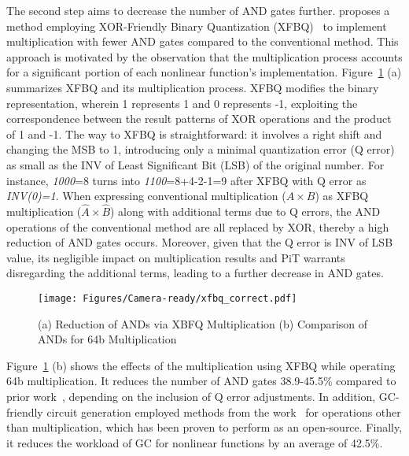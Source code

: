 The second step aims to decrease the number of AND gates further. \sysname proposes a method employing XOR-Friendly Binary Quantization (XFBQ)~\cite{jian2020fast} to implement multiplication with fewer AND gates compared to the conventional method. This approach is motivated by the observation that the multiplication process accounts for a significant portion of each nonlinear function's implementation. 
Figure~\ref{fig:circuit_generation} (a) summarizes XFBQ and its multiplication process. XFBQ modifies the binary representation, wherein 1 represents 1 and 0 represents -1, exploiting the correspondence between the result patterns of XOR operations and the product of 1 and -1. The way to XFBQ is straightforward: it involves a right shift and changing the MSB to 1, introducing only a minimal quantization error (Q error) as small as the INV of Least Significant Bit (LSB) of the original number. For instance, \textit{1000}=8 turns into \textit{1100}=8+4-2-1=9 after XFBQ with Q error as \textit{INV(0)=1}.  When expressing conventional multiplication ($A\times B$) as XFBQ multiplication ($\hat{A} \times \hat{B}$) along with additional terms due to Q errors, the AND operations of the conventional method are all replaced by XOR, thereby a high reduction of AND gates occurs. Moreover, given that the Q error is INV of LSB value, its negligible impact on multiplication results and PiT warrants disregarding the additional terms, leading to a further decrease in AND gates.

\begin{figure}[t]
    \vspace{-0.2in}
    \centering
    \texttt{[image: Figures/Camera-ready/xfbq\_correct.pdf]}
    \caption{(a) Reduction of ANDs via XBFQ Multiplication (b) Comparison of ANDs for 64b Multiplication}
    \vspace{-0.2in}
    \label{fig:circuit_generation}
\end{figure}

Figure~\ref{fig:circuit_generation} (b) shows the effects of the multiplication using XFBQ while operating 64b multiplication. It reduces the number of AND gates 38.9-45.5\% compared to prior work~\cite{liu2022don}, depending on the inclusion of Q error adjustments. In addition, GC-friendly circuit generation employed methods from the work~\cite{testa2020logic} for operations other than multiplication, which has been proven to perform as an open-source. Finally, it reduces the workload of GC for nonlinear functions by an average of 42.5\%.



